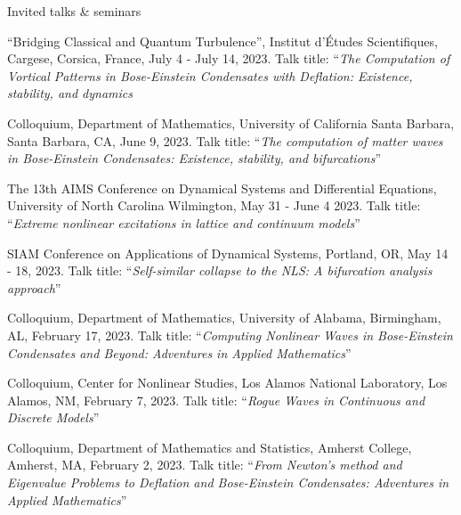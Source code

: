 \documentclass[10pt]{article} %
\begin{document}
\begin{section}{Invited talks \& seminars}
\begin{etaremune}
\item ``Bridging Classical and Quantum Turbulence'',
Institut d'\'Etudes Scientifiques, Cargese, Corsica, France, July 4 - July 14, 2023.
Talk title: ``\textit{The Computation of Vortical Patterns in Bose-Einstein Condensates with
Deflation: Existence, stability, and dynamics}

\item Colloquium, Department of Mathematics, University of California Santa Barbara, Santa Barbara, CA, June 9, 2023.
Talk title: ``\textit{The computation of matter waves in Bose-Einstein Condensates: Existence, stability, and bifurcations}''


\item The 13th AIMS Conference on Dynamical Systems and Differential Equations, University of North Carolina Wilmington, %
May 31 - June 4 2023. Talk title: ``\textit{Extreme nonlinear excitations in lattice and continuum models}''

\item SIAM Conference on Applications of Dynamical Systems, Portland, OR, May 14 - 18, 2023. 
Talk title: ``\textit{Self-similar collapse to the NLS: A bifurcation analysis approach}''

\item Colloquium, Department of Mathematics, University of Alabama, Birmingham, AL, February 17, 2023. 
Talk title: ``\textit{Computing Nonlinear Waves in Bose-Einstein Condensates and Beyond: Adventures in 
Applied Mathematics}''

\item Colloquium, Center for Nonlinear Studies, Los Alamos National Laboratory, Los Alamos, NM, February 7, 2023. 
      Talk title: ``\textit{Rogue Waves in Continuous and Discrete Models}''

\item Colloquium, Department of Mathematics and Statistics, Amherst College, Amherst, MA, February 2, 2023. 
Talk title: ``\textit{From Newton's method and Eigenvalue Problems to Deflation and Bose-Einstein 
Condensates: Adventures in Applied Mathematics}''


\end{etaremune}
\end{section}
\end{document}
